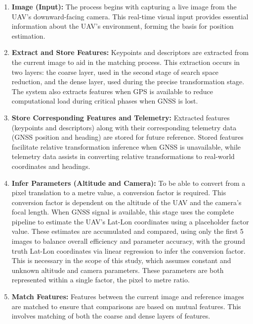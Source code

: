 \begin{enumerate}
    \item \textbf{Image (Input):}  
    The process begins with capturing a live image from the UAV’s downward-facing camera. This real-time visual input provides essential information about the UAV’s environment, forming the basis for position estimation.

    \item \textbf{Extract and Store Features:}  
    Keypoints and descriptors are extracted from the current image to aid in the matching process. This extraction occurs in two layers: the coarse layer, used in the second stage of search space reduction, and the dense layer, used during the precise transformation stage. The system also extracts features when GPS is available to reduce computational load during critical phases when GNSS is lost.
    

    \item \textbf{Store Corresponding Features and Telemetry:}  
    Extracted features (keypoints and descriptors) along with their corresponding telemetry data (GNSS position and heading) are stored for future reference. Stored features facilitate relative transformation inference when GNSS is unavailable, while telemetry data assists in converting relative transformations to real-world coordinates and headings.

    \item \textbf{Infer Parameters (Altitude and Camera):}  
    To be able to convert from a pixel translation to a metre value, a conversion factor is required. This conversion factor is dependent on the altitude of the UAV and the camera's focal length. When GNSS signal is available, this stage uses the complete pipeline to estimate the UAV's Lat-Lon coordinates using a placeholder factor value. These estimates are accumulated and compared, using only the first 5 images to balance overall efficiency and parameter accuracy, with the ground truth Lat-Lon coordinates via linear regression to infer the conversion factor. This is necessary in the scope of this study, which assumes constant and unknown altitude and camera parameters. These parameters are both represented within a single factor, the pixel to metre ratio. 

    \item \textbf{Match Features:}  
    Features between the current image and reference images are matched to ensure that comparisons are based on mutual features. This involves matching of both the coarse and dense layers of features.


\end{enumerate}
